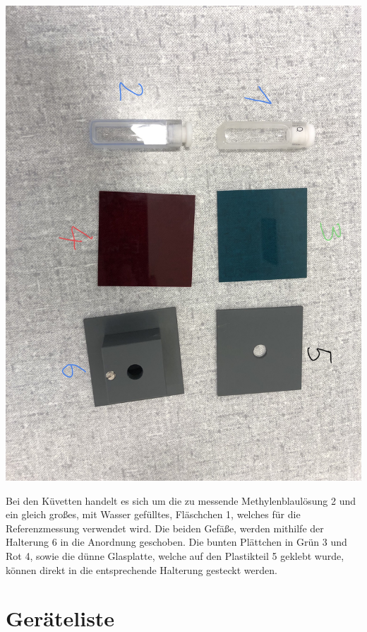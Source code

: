 \documentclass[11pt,ngerman]{scrartcl}
\begin{document}
\begin{center}
	\begin{minipage}{0.5\textwidth}
		\includegraphics[angle=90, width=\textwidth]{material}
		\label{fig:material}
	\end{minipage}
\end{center}

\noindent Bei den Küvetten handelt es sich um die zu messende
Methylenblaulösung 2 und ein gleich großes, mit Wasser gefülltes, Fläschchen 1,
welches für die Referenzmessung verwendet wird. Die beiden Gefäße, werden
mithilfe der Halterung 6 in die Anordnung geschoben. Die bunten Plättchen in
Grün 3 und Rot 4, sowie die dünne Glasplatte, welche auf den Plastikteil 5
geklebt wurde, können direkt in die entsprechende Halterung gesteckt werden.

\newpage

\section{Geräteliste}
\end{document}
